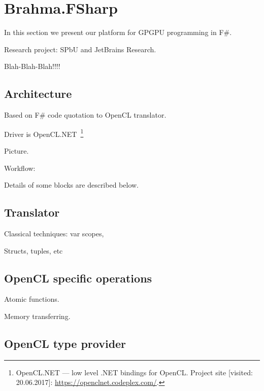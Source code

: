 \section{Brahma.FSharp}

In this section we present our platform for GPGPU programming in F\#.

Research project: SPbU and JetBrains Research.

Blah-Blah-Blah!!!!

\subsection{Architecture}

Based on F\# code quotation to OpenCL translator.

Driver is OpenCL.NET~\footnote{OpenCL.NET --- low level .NET bindings for OpenCL. Project site [visited: 20.06.2017]: \url{https://openclnet.codeplex.com/}.}

Picture.

Workflow:

Details of some blocks are described below.

\subsection{Translator}

Classical techniques: var scopes,

Structs, tuples, etc

\subsection{OpenCL specific operations}

Atomic functions.

Memory transferring.

\subsection{OpenCL type provider}
